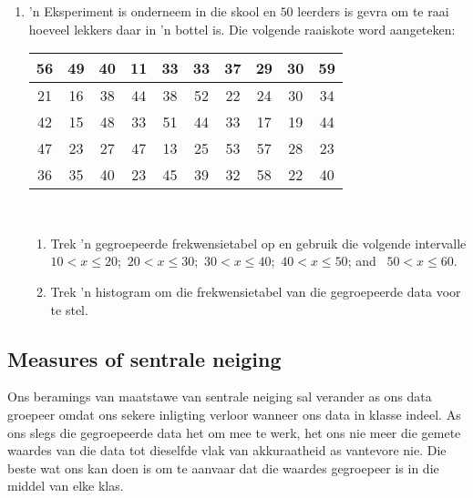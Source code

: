 \begin{exercises}{}{
    \begin{enumerate}[itemsep=5pt, label=\textbf{\arabic*}. ]
    \item ’n Eksperiment is onderneem in die skool en $50$ leerders is gevra om te raai hoeveel lekkers daar in ’n bottel is. Die volgende raaiskote word aangeteken:
      \\
      \begin{center}
        \begin{tabular}{|c|c|c|c|c|c|c|c|c|c|} \hline
          56 & 49 & 40 & 11 & 33 & 33 & 37 & 29 & 30 & 59 \\ \hline
          21 & 16 & 38 & 44 & 38 & 52 & 22 & 24 & 30 & 34 \\\hline
          42 & 15 & 48 & 33 & 51 & 44 & 33 & 17 & 19 & 44 \\\hline
          47 & 23 & 27 & 47 & 13 & 25 & 53 & 57 & 28 & 23 \\\hline
          36 & 35 & 40 & 23 & 45 & 39 & 32 & 58 & 22 & 40 \\\hline
        \end{tabular}
      \end{center}
      \vspace{8pt}\\

      \begin{enumerate}[noitemsep, label=\textbf{(\alph*)} ]
      \item Trek ’n gegroepeerde frekwensietabel op en gebruik die volgende intervalle
        $10 < x \leq 20$;\ $20 < x \leq 30$;\ $30 < x \leq 40$;\ 
        $40 < x \leq 50$; and \ $50 < x \leq 60$.
      \item Trek ’n histogram om die frekwensietabel van die gegroepeerde data voor te stel.
      \end{enumerate}
    \end{enumerate}
}
\end{exercises}
% 
\subsection*{Measures of sentrale neiging}
Ons beramings van maatstawe van sentrale neiging sal verander as ons data groepeer omdat ons sekere inligting verloor wanneer ons data in klasse indeel. As ons slegs die gegroepeerde data het om mee te werk, het ons nie meer die gemete waardes van die data tot dieselfde vlak van akkuraatheid as vantevore nie. Die beste wat ons kan doen is om te aanvaar dat die waardes gegroepeer is in die middel van elke klas.\par

